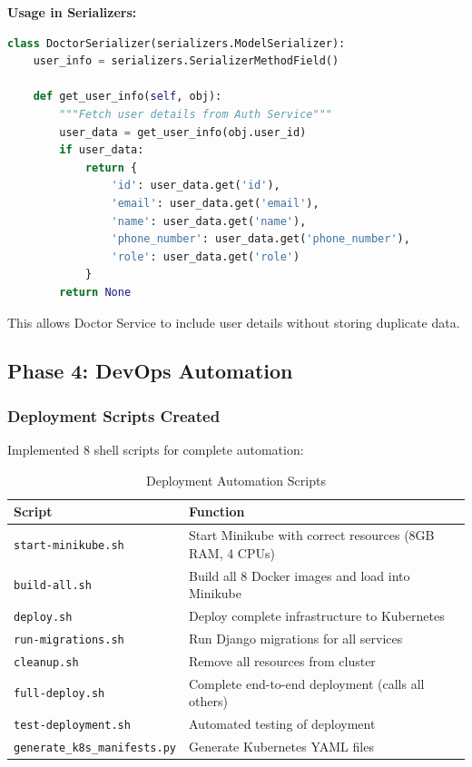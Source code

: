 \documentclass[12pt,a4paper]{article}
\begin{document}
\textbf{Usage in Serializers:}
\begin{lstlisting}[language=Python,caption={Including User Data in API Response}]
class DoctorSerializer(serializers.ModelSerializer):
    user_info = serializers.SerializerMethodField()

    def get_user_info(self, obj):
        """Fetch user details from Auth Service"""
        user_data = get_user_info(obj.user_id)
        if user_data:
            return {
                'id': user_data.get('id'),
                'email': user_data.get('email'),
                'name': user_data.get('name'),
                'phone_number': user_data.get('phone_number'),
                'role': user_data.get('role')
            }
        return None
\end{lstlisting}

This allows Doctor Service to include user details without storing duplicate data.

\subsection{Phase 4: DevOps Automation}

\subsubsection{Deployment Scripts Created}
Implemented 8 shell scripts for complete automation:

\begin{table}[h]
\centering
\begin{tabular}{@{}lp{7cm}@{}}
\toprule
\textbf{Script} & \textbf{Function} \\
\midrule
\texttt{start-minikube.sh} & Start Minikube with correct resources (8GB RAM, 4 CPUs) \\
\texttt{build-all.sh} & Build all 8 Docker images and load into Minikube \\
\texttt{deploy.sh} & Deploy complete infrastructure to Kubernetes \\
\texttt{run-migrations.sh} & Run Django migrations for all services \\
\texttt{cleanup.sh} & Remove all resources from cluster \\
\texttt{full-deploy.sh} & Complete end-to-end deployment (calls all others) \\
\texttt{test-deployment.sh} & Automated testing of deployment \\
\texttt{generate\_k8s\_manifests.py} & Generate Kubernetes YAML files \\
\bottomrule
\end{tabular}
\caption{Deployment Automation Scripts}
\end{table}
\end{document}
